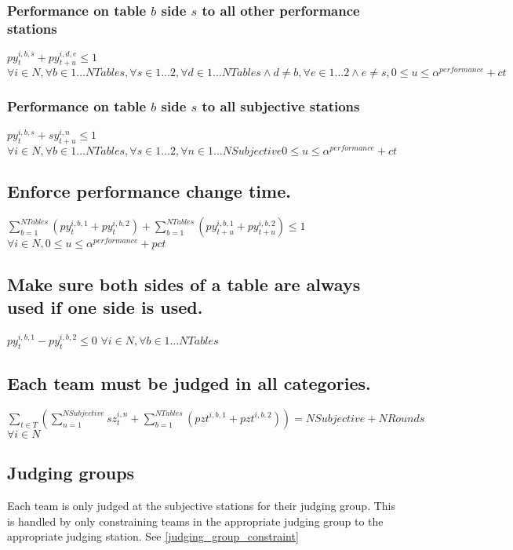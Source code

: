 \documentclass[letterpaper,11pt]{report}
\begin{document}
\subsubsection{Performance on table $b$ side $s$ to all other performance stations}
$py_{t}^{i,b,s} + py_{t+u}^{i,d,e} \le 1$
\hfill $\forall i \in N,
\forall b \in 1 \dots NTables,
\forall s \in 1 \dots 2,
\forall d \in 1 \dots NTables \wedge d \neq b,
\forall e \in 1 \dots 2 \wedge e \neq s,
0 \le u \le \alpha^{performance}+ ct$

\subsubsection{Performance on table $b$ side $s$ to all subjective stations}
$py_{t}^{i,b,s} + sy_{t+u}^{i,n} \le 1$
\hfill $\forall i \in N,
\forall b \in 1 \dots NTables,
\forall s \in 1 \dots 2,
\forall n \in 1 \dots NSubjective
0 \le u \le \alpha^{performance}+ ct$


\subsection{Enforce performance change time.}
$
\sum\limits_{b=1}^{NTables} (py_{t}^{i,b,1} + py_{t}^{i,b,2})
+
\sum\limits_{b=1}^{NTables} (py_{t+u}^{i,b,1} + py_{t+u}^{i,b,2}) 
\le 1$
\hfill $\forall i \in N, 
0 \le u \le \alpha^{performance} + pct$


\subsection{Make sure both sides of a table are always used if one side is
  used.}
$py_{t}^{i,b,1} - py_{t}^{i,b,2} \le 0$
\hfill $\forall i \in N,
\forall b \in 1 \dots NTables$


\subsection{Each team must be judged in all categories.}
$\sum\limits_{t \in T} ( 
    \sum\limits_{n=1}^{NSubjective} sz_{t}^{i,n}  
 + \sum\limits_{b=1}^{NTables} (pz{t}^{i,b,1} + pz{t}^{i,b,2})
)
= NSubjective + NRounds$
\hfill $\forall i \in N$


\subsection{Judging groups}
Each team is only judged at the subjective stations for their judging
group. This is handled by only constraining teams in the appropriate
judging group to the appropriate judging station. See \autoref{judging_group_constraint}
\end{document}

